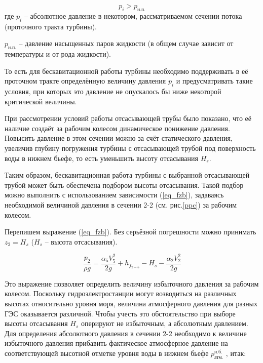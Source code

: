 \begin{equation}
\label{eq_fzc}
   p_i > p_{\text{н.п.}}
\end{equation}
где $p_i$ -- абсолютное давление в некотором, рассматриваемом сечении потока (проточного тракта турбины).

$p_{\text{н.п.}}$ -- давление насыщенных паров жидкости (в общем случае зависит от температуры и от рода жидкости).

\vspace{0.5 cm}

То есть для бескавитационной работы турбины необходимо поддерживать в её проточном тракте определённую величину давления $p_i$ и предусматривать такие условия, при которых это давление не опускалось бы ниже некоторой критической величины.

\vspace{0.5 cm}

При рассмотрении условий работы отсасывающей трубы было показано, что её наличие создаёт за рабочим колесом динамическое понижение давления. Повысить давление в этом сечении можно за счёт статического давления, увеличив глубину погружения турбины с отсасывающей трубой под поверхность воды в нижнем бьефе, то есть уменьшить высоту отсасывания $H_s$.

Таким образом, бескавитационная работа турбины с выбранной отсасывающей трубой может быть обеспечена подбором высоты отсасывания. Такой подбор можно выполнить с использованием зависимости (\ref{eq_fzb}), задаваясь необходимой величиной давления в сечении 2-2 (см. рис.\ref{ppc}) за рабочим колесом.

Перепишем выражение (\ref{eq_fzb}). Без серьёзной погрешности можно принимать $z_2 = H_s$ ($H_s$ -- высота отсасывания).


$$
   \frac{p_2}{\rho g} = \frac{\alpha_5 V_5^2 }{2 g} + h_{f_{2-5}} - H_s - \frac{\alpha_2 V_2^2 }{2 g}
$$

Это выражение позволяет определить величину избыточного давления за рабочим колесом. Поскольку гидроэлектростанции могут возводиться на различных высотах относительно уровня моря, величина атмосферного давления для разных ГЭС оказывается различной. Чтобы учесть это обстоятельство при выборе высоты отсасывания $H_s$ оперируют не избыточным, а абсолютным давлением. Для определения абсолютного давления в сечении 2-2 необходимо к величине избыточного давления прибавить фактическое атмосферное давление на соответствующей высотной отметке уровня воды в нижнем бьефе $p_{\text{атм.}}^{\text{н.б.}}$ , итак:


